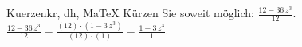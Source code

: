 \begin{MAufgabe}{Kuerzen}{kr, dh, MaTeX}
K\"urzen Sie soweit m\"oglich: $\frac{12 - 36\, z^3}{12}$.\\ 
\ifLsg\MLoesung
\quad $\frac{12 - 36\, z^3}{12}=\frac{(12)\cdot(1 - 3\, z^3)}{(12)\cdot(1)}=\frac{1 - 3\, z^3}{1}$.\else\relax\fi
 \end{MAufgabe}